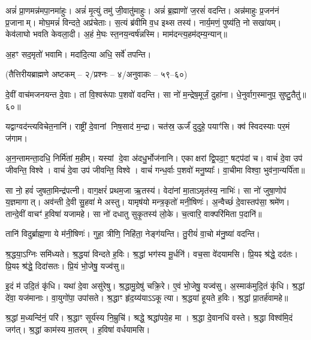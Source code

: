अन्नं॑ प्रा॒णमन्न॑मपा॒नमा॑हुः।
अन्नं॑ मृ॒त्युं तमु॑ जी॒वातु॑माहुः।
अन्नं॑ ब्र॒ह्माणो॑ ज॒रसं॑  वदन्ति।
अन्न॑माहुः प्र॒जन॑नं प्र॒जानाम्।
मोघ॒मन्नं॑ विन्दते॒ अप्र॑चेताः।
स॒त्यं ब्र॑वीमि व॒ध इथ्स तस्य॑।
नार्य॒मणं॒ पुष्य॑ति॒ नो सखा॑यम्।
केव॑लाघो भवति केवला॒दी।
अ॒हं मे॒घः स्त॒नय॒न्वर्\mbox{}ष॑न्नस्मि।
माम॑दन्त्य॒हम॑द्म्य॒न्यान्॥

अ॒हꣳ सद॒मृतो॑ भवामि।
मदा॑दि॒त्या अधि॒ सर्वे॑ तपन्ति।

\centerline{\normalsize (तैत्तिरीयब्राह्मणे अष्टकम् – २/प्रश्नः – ४/अनुवाकः – ५९–६०)}

दे॒वीं वाच॑मजनयन्त दे॒वाः।
तां वि॒श्वरू॑पाः प॒शवो॑ वदन्ति।
सा नो॑ म॒न्द्रेष॒मूर्जं॒ दुहा॑ना।
धे॒नुर्वाग॒स्मानुप॒ सुष्टु॒तैतु॑॥६०॥


यद्वाग्वद॑न्त्यविचेत॒नानि॑।
राष्ट्री॑ दे॒वानां निष॒साद॑ म॒न्द्रा।
चत॑स्र॒ ऊर्जं॑ दुदुहे॒ पयाꣳ॑सि।
क्व॑ स्विदस्याः पर॒मं ज॑गाम।

\closesection

अ॒न॒न्तामन्ता॒दधि॒ निर्मि॑तां म॒हीम्।
यस्यां दे॒वा अ॑दधु॒र्भोज॑नानि।
एकाक्षरां द्वि॒पदा॒ꣳ॒ षट्प॑दां च।
वाचं॑ दे॒वा उप॑ जीवन्ति॒ विश्वे।
वाचं॑ दे॒वा उप॑ जीवन्ति॒ विश्वे।
वाचं॑ गन्ध॒र्वाः प॒शवो॑ मनु॒ष्याः᳚।
वा॒चीमा विश्वा॒ भुव॑ना॒न्यर्पि॑ता॥

सा नो॒ हवं॑ जुषता॒मिन्द्र॑पत्नी।
वाग॒क्षरं॑ प्रथम॒जा ऋ॒तस्य॑।
वेदा॑नां मा॒ताऽमृत॑स्य॒ नाभिः॑।
सा नो॑ जुषा॒णोप॑ य॒ज्ञमागात्।
अव॑न्ती दे॒वी सु॒हवा॑ मे अस्तु।
यामृष॑यो मन्त्र॒कृतो॑ मनी॒षिणः॑।
अ॒न्वैच्छं॑ दे॒वास्तप॑सा॒ श्रमे॑ण।
तान्दे॒वीं वाचꣳ॑ ह॒विषा॑ यजामहे।
सा नो॑ दधातु सुकृ॒तस्य॑ लो॒के।
च॒त्वारि॒ वाक्परि॑मिता प॒दानि॑॥

तानि॑ विदुर्ब्राह्म॒णा ये म॑नी॒षिणः॑।
गुहा॒ त्रीणि॒ निहि॑ता॒ नेङ्ग॑यन्ति।
तु॒रीयं॑ वा॒चो म॑नु॒ष्या॑ वदन्ति।


श्र॒द्धया॒ऽग्निः समि॑ध्यते।
श्र॒द्धया॑ विन्दते ह॒विः।
श्र॒द्धां भग॑स्य मू॒र्धनि॑।
वच॒सा वे॑दयामसि।
प्रि॒यꣴ श्र॑द्धे॒ दद॑तः।
प्रि॒यꣴ श्र॑द्धे॒ दिदा॑सतः।
प्रि॒यं भो॒जेषु॒ यज्व॑सु॥

इ॒दं म॑ उदि॒तं कृ॑धि।
यथा॑ दे॒वा असु॑रेषु।
श्र॒द्धामु॒ग्रेषु॑ चक्रि॒रे।
ए॒वं भो॒जेषु॒ यज्व॑सु।
अ॒स्माक॑मुदि॒तं कृ॑धि।
श्र॒द्धां दे॑वा॒ यज॑मानाः।
वा॒युगो॑पा॒ उपा॑सते।
श्र॒द्धाꣳ हृ॑द॒य्य॑याऽऽकूत्या।
श्र॒द्धया॑ हूयते ह॒विः।
श्र॒द्धां प्रा॒तर्\mbox{}ह॑वामहे॥

श्र॒द्धां म॒ध्यन्दि॑नं॒ परि॑।
श्र॒द्धाꣳ सूर्य॑स्य नि॒म्रुचि॑।
श्रद्धे॒ श्रद्धा॑पये॒ह मा।
श्र॒द्धा दे॒वानधि॑ वस्ते।
श्र॒द्धा विश्व॑मि॒दं जग॑त्।
श्र॒द्धां काम॑स्य मा॒तरम्।
ह॒विषा॑ वर्धयामसि।

